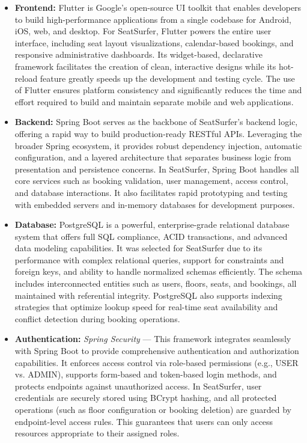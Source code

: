 \documentclass[12pt,a4paper]{report}
\begin{document}
\begin{itemize}
    \item \textbf{Frontend:} Flutter is Google's open-source UI toolkit that enables developers to build high-performance applications from a single codebase for Android, iOS, web, and desktop. For SeatSurfer, Flutter powers the entire user interface, including seat layout visualizations, calendar-based bookings, and responsive administrative dashboards. Its widget-based, declarative framework facilitates the creation of clean, interactive designs while its hot-reload feature greatly speeds up the development and testing cycle. The use of Flutter ensures platform consistency and significantly reduces the time and effort required to build and maintain separate mobile and web applications.

    \item \textbf{Backend:} Spring Boot serves as the backbone of SeatSurfer's backend logic, offering a rapid way to build production-ready RESTful APIs. Leveraging the broader Spring ecosystem, it provides robust dependency injection, automatic configuration, and a layered architecture that separates business logic from presentation and persistence concerns. In SeatSurfer, Spring Boot handles all core services such as booking validation, user management, access control, and database interactions. It also facilitates rapid prototyping and testing with embedded servers and in-memory databases for development purposes.

    \item \textbf{Database:} PostgreSQL is a powerful, enterprise-grade relational database system that offers full SQL compliance, ACID transactions, and advanced data modeling capabilities. It was selected for SeatSurfer due to its performance with complex relational queries, support for constraints and foreign keys, and ability to handle normalized schemas efficiently. The schema includes interconnected entities such as users, floors, seats, and bookings, all maintained with referential integrity. PostgreSQL also supports indexing strategies that optimize lookup speed for real-time seat availability and conflict detection during booking operations.

    \item \textbf{Authentication:} \textit{Spring Security} — This framework integrates seamlessly with Spring Boot to provide comprehensive authentication and authorization capabilities. It enforces access control via role-based permissions (e.g., USER vs. ADMIN), supports form-based and token-based login methods, and protects endpoints against unauthorized access. In SeatSurfer, user credentials are securely stored using BCrypt hashing, and all protected operations (such as floor configuration or booking deletion) are guarded by endpoint-level access rules. This guarantees that users can only access resources appropriate to their assigned roles.


\end{itemize}
\end{document}
